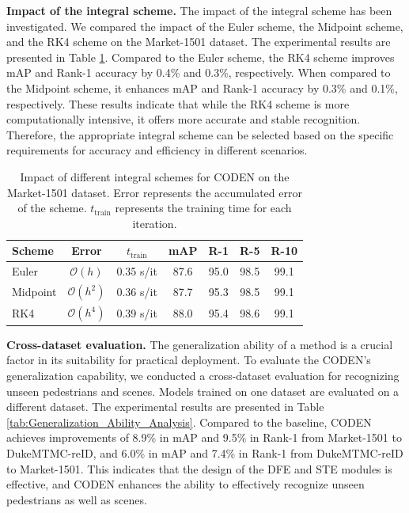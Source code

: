 \documentclass[12pt]{spieman}  %
\begin{document}
\begin{spacing}{2}
\textbf{Impact of the integral scheme.} The impact of the integral scheme has been investigated. We compared the impact of the Euler scheme, the Midpoint scheme, and the RK4 scheme on the Market-1501 dataset. The experimental results are presented in Table \ref{tab:integral_scheme}. Compared to the Euler scheme, the RK4 scheme improves mAP and Rank-1 accuracy by 0.4\% and 0.3\%, respectively. When compared to the Midpoint scheme, it enhances mAP and Rank-1 accuracy by 0.3\% and 0.1\%, respectively. These results indicate that while the RK4 scheme is more computationally intensive, it offers more accurate and stable recognition. Therefore, the appropriate integral scheme can be selected based on the specific requirements for accuracy and efficiency in different scenarios.

\begin{table}[h]
	\caption{Impact of different integral schemes for CODEN on the Market-1501 dataset. Error represents the accumulated error of the scheme. $t_{\text{train}}$ represents the training time for each iteration.}
	\label{tab:integral_scheme}
	\begin{tabular*}{\textwidth}{@{\extracolsep\fill}lcccccc}
		\toprule%
		Scheme & Error & $t_{\text{train}}$ & mAP & R-1  & R-5  & R-10 \\
		\midrule
		Euler  & $\mathcal{O}(h)$  & 0.35 s/it  & 87.6  &95.0 & 98.5 & 99.1  \\
		Midpoint  & $\mathcal{O}(h^2)$  & 0.36 s/it & 87.7  & 95.3 & 98.5 & 99.1    \\
		RK4  & $\mathcal{O}(h^4)$  & 0.39 s/it &  88.0  &95.4 &98.6  & 99.1    \\
		\bottomrule
	\end{tabular*}
\end{table}

\textbf{Cross-dataset evaluation.} The generalization ability of a method is a crucial factor in its suitability for practical deployment. To evaluate the CODEN's generalization capability, we conducted a cross-dataset evaluation for recognizing unseen pedestrians and scenes. Models trained on one dataset are evaluated on a different dataset. The experimental results are presented in Table \ref{tab:Generalization_Ability_Analysis}. Compared to the baseline, CODEN achieves improvements of 8.9\% in mAP and 9.5\% in Rank-1 from Market-1501 to DukeMTMC-reID, and 6.0\% in mAP and 7.4\% in Rank-1 from DukeMTMC-reID to Market-1501. This indicates that the design of the DFE and STE modules is effective, and CODEN enhances the ability to effectively recognize unseen pedestrians as well as scenes.


\end{spacing}
\end{document}
